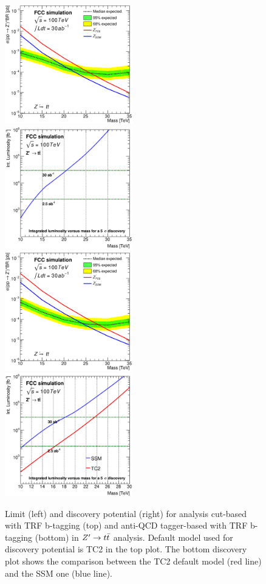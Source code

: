 \documentclass{cernrep}
\begin{document}
\begin{figure}[!htb]\centering
\includegraphics[width=0.495\textwidth]{Fig/Zptt/lim_Zprime_tt_fcc_v02_cut_TRFbtag.eps}
\includegraphics[width=0.495\textwidth]{Fig/Zptt/DiscoveryPotential_tt_cut_TRFbtag_rootStyle.eps}
\includegraphics[width=0.495\textwidth]{Fig/Zptt/lim_Zprime_tt_fcc_v02_tagger_TRFbtag.eps}
\includegraphics[width=0.495\textwidth]{Fig/Zptt/DiscoveryPotential_tt_SSM_TC2_tagger_TRFbtag_rootStyle.eps}
\caption{Limit (left) and discovery potential (right) for analysis cut-based with TRF b-tagging (top) and anti-QCD tagger-based with TRF b-tagging (bottom) in $Z^{\prime} \rightarrow t\bar{t}$ analysis. Default model used for discovery potential is TC2 in the top plot. The bottom discovery plot shows the comparison between the TC2 default model (red line) and the SSM one (blue line).}
\label{fig:Zptt_limit_trf}
\end{figure}
\end{document}
